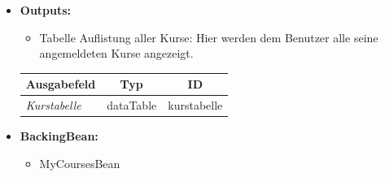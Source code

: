 \begin{itemize}
				
			\item \textbf{Outputs:}
				\begin{itemize}
					\item Tabelle Auflistung aller Kurse: Hier werden dem Benutzer alle seine angemeldeten Kurse angezeigt.
				\end{itemize}
				
				\begin{center}
					\begin{longtable}{|p{5cm} | p{4cm}|p{3cm}|}
						
						\hline \multicolumn{1}{|c|}{\textbf{Ausgabefeld}} & \multicolumn{1}{|c|}{\textbf{Typ}}  &  \multicolumn{1}{|c|}{\textbf{ID}} \\ \hline
						\endfirsthead
						\hline
						\endlastfoot
						\textit{Kurstabelle}  & dataTable & kurstabelle \\ \hline
					\end{longtable}
				\end{center}
				
			\item \textbf{BackingBean:}
				\begin{itemize}
					\item MyCoursesBean
				\end{itemize}
		\end{itemize}
		
